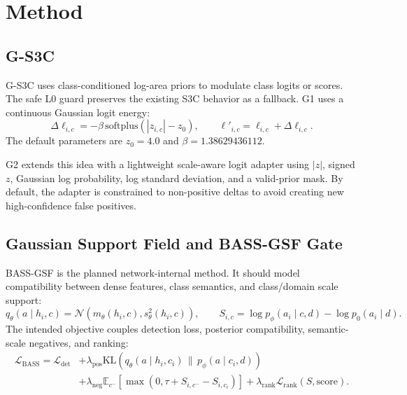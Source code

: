\documentclass[10pt]{article}
\begin{document}
\section{Method}

\subsection{G-S3C}

G-S3C uses class-conditioned log-area priors to modulate class logits or scores.
The safe L0 guard preserves the existing S3C behavior as a fallback.  G1 uses a
continuous Gaussian logit energy:
\begin{equation}
  \Delta \ell_{i,c} = -\beta\,\mathrm{softplus}(|z_{i,c}| - z_0),
  \qquad
  \ell'_{i,c} = \ell_{i,c} + \Delta \ell_{i,c}.
\end{equation}
The default parameters are $z_0=4.0$ and $\beta=1.38629436112$.

G2 extends this idea with a lightweight scale-aware logit adapter using
$|z|$, signed $z$, Gaussian log probability, log standard deviation, and a
valid-prior mask.  By default, the adapter is constrained to non-positive
deltas to avoid creating new high-confidence false positives.

\subsection{Gaussian Support Field and BASS-GSF Gate}

BASS-GSF is the planned network-internal method.  It should model compatibility
between dense features, class semantics, and class/domain scale support:
\begin{equation}
  q_\theta(a\mid h_i,c)=
  \mathcal{N}(m_\theta(h_i,c),s_\theta^2(h_i,c)), \qquad
  S_{i,c}=\log p_\phi(a_i\mid c,d)-\log p_0(a_i\mid d).
\end{equation}
The intended objective couples detection loss, posterior compatibility,
semantic-scale negatives, and ranking:
\begin{equation}
\begin{aligned}
  \mathcal{L}_{\mathrm{BASS}} =
  \mathcal{L}_{\mathrm{det}}
  &+ \lambda_{\mathrm{pos}}
  \mathrm{KL}\!\left(q_\theta(a\mid h_i,c_i)\,\|\,p_\phi(a\mid c_i,d)\right)\\
  &+ \lambda_{\mathrm{neg}}
  \mathbb{E}_{c^-}\left[\max(0,\tau+S_{i,c^-}-S_{i,c_i})\right]
  + \lambda_{\mathrm{rank}}\mathcal{L}_{\mathrm{rank}}(S,\mathrm{score}).
\end{aligned}
\end{equation}
\end{document}
